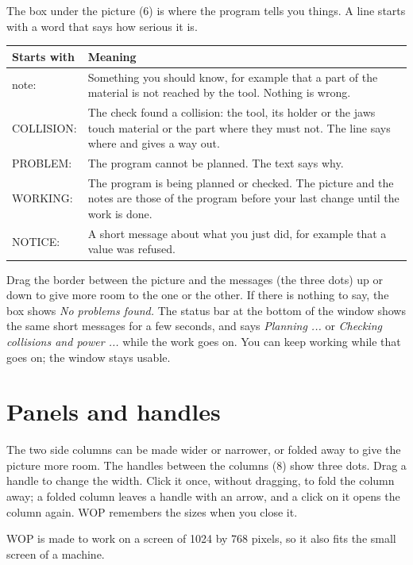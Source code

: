 The box under the picture (6) is where the program tells you things. A line starts with a word that says how serious it is.

\begin{center}
\begin{tabularx}{\textwidth}{@{}l Y@{}}
\toprule
\textbf{Starts with} & \textbf{Meaning} \\
\midrule
\textsf{note:} & Something you should know, for example that a part of the material is not reached by the tool. Nothing is wrong. \\
\textsf{COLLISION:} & The check found a collision: the tool, its holder or the jaws touch material or the part where they must not. The line says where and gives a way out. \\
\textsf{PROBLEM:} & The program cannot be planned. The text says why. \\
\textsf{WORKING:} & The program is being planned or checked. The picture and the notes are those of the program before your last change until the work is done. \\
\textsf{NOTICE:} & A short message about what you just did, for example that a value was refused. \\
\bottomrule
\end{tabularx}
\end{center}

Drag the border between the picture and the messages (the three dots) up or down to give more room to the one or the other. If there is nothing to say, the box shows \emph{No problems found.} The status bar at the bottom of the window shows the same short messages for a few seconds, and says \emph{Planning ...} or \emph{Checking collisions and power ...} while the work goes on. You can keep working while that goes on; the window stays usable.

\section{Panels and handles}\label{sec:window:handles}

The two side columns can be made wider or narrower, or folded away to give the picture more room. The handles between the columns (8) show three dots. Drag a handle to change the width. Click it once, without dragging, to fold the column away; a folded column leaves a handle with an arrow, and a click on it opens the column again. WOP remembers the sizes when you close it.

WOP is made to work on a screen of 1024 by 768 pixels, so it also fits the small screen of a machine.
